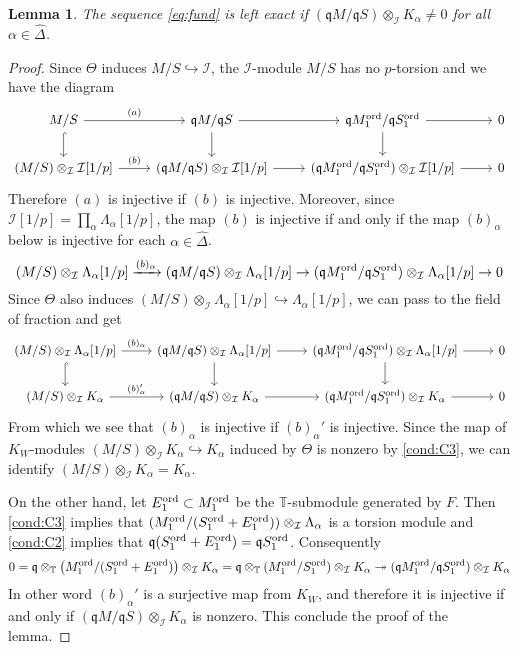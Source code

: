 \documentclass[leqno]{amsart}
\newtheorem{lem}[thm]{Lemma}
\theoremstyle{definition}
\theoremstyle{remark}
\newcommand{\fq}{\mathfrak{q}}
\newcommand{\TT}{\mathbb{T}} %
\newcommand{\I}{\mathcal{I}} %
\newcommand{\ord}{\textnormal{ord}} %
\begin{document}
\begin{lem}\label{lem:inj_crit}
The sequence \eqref{eq:fund}
is left exact if 
$(\fq M/\fq S)\otimes_{\I}K_\alpha\neq 0$
for all $\alpha\in\hat{\Delta}$.
\end{lem}
\begin{proof}
Since $\Theta$ induces $M/S\hookrightarrow\I$,
the $\I$-module $M/S$ has no $p$-torsion and we have the diagram
\[
\begin{tikzcd}
M/S
\arrow[r,"(a)"]\arrow[d,hookrightarrow] &
\fq M/\fq S
\arrow[r]\arrow[d] &
\fq M_1^{\ord}/\fq S_1^{\ord}
\arrow[r]\arrow[d] & 0\\
(M/S)\otimes_{\I}\I[1/p]
\arrow[r,"(b)"] &
(\fq M/\fq S)\otimes_{\I}\I[1/p]
\arrow[r] &
(\fq M_1^{\ord}/\fq S_1^{\ord})\otimes_{\I}\I[1/p]
\arrow[r] & 0
\end{tikzcd}
\]
Therefore $(a)$ is injective if
$(b)$ is injective.
Moreover, since $\I[1/p]=\prod_\alpha \Lambda_\alpha[1/p]$,
the map $(b)$ is injective if and only if the map $(b)_\alpha$ below
is injective for each $\alpha\in\hat{\Delta}$.
\[
(M/S)\otimes_{\I}\Lambda_\alpha[1/p]
\xrightarrow{(b)_\alpha}
(\fq M/\fq S)\otimes_{\I}\Lambda_\alpha[1/p] \to
(\fq M_1^{\ord}/\fq S_1^{\ord})\otimes_{\I}\Lambda_\alpha[1/p]\to 0
\]
Since $\Theta$ also induces
$(M/S)\otimes_{\I}\Lambda_\alpha[1/p]
\hookrightarrow\Lambda_\alpha[1/p]$,
we can pass to the field of fraction and get
\[
\begin{tikzcd}
(M/S)\otimes_{\I}\Lambda_\alpha[1/p]
\arrow[r,"(b)_\alpha"]\arrow[d,hookrightarrow] &
(\fq M/\fq S)\otimes_{\I}\Lambda_\alpha[1/p]
\arrow[r]\arrow[d] &
(\fq M_1^{\ord}/\fq S_1^{\ord})\otimes_{\I}\Lambda_\alpha[1/p]
\arrow[r]\arrow[d] & 0\\
(M/S)\otimes_{\I}K_\alpha
\arrow[r,"(b)_\alpha'"] &
(\fq M/\fq S)\otimes_{\I}K_\alpha
\arrow[r] &
(\fq M_1^{\ord}/\fq S_1^{\ord})\otimes_{\I}K_\alpha
\arrow[r] & 0
\end{tikzcd}
\]
From which we see that $(b)_\alpha$ 
is injective if $(b)_\alpha'$ is injective.
Since the map of $K_W$-modules
$(M/S)\otimes_{\I}K_\alpha\hookrightarrow K_\alpha$
induced by $\Theta$ is nonzero by \ref{cond:C3},
we can identify
$(M/S)\otimes_{\I}K_\alpha=K_\alpha$.

On the other hand,
let $E_1^{\ord}\subset M_1^{\ord}$
be the $\TT$-submodule generated by $F$.
Then \ref{cond:C3} implies that
$(M_1^{\ord}/(S_1^{\ord}+E_1^{\ord}))\otimes_{\I}\Lambda_\alpha$
is a torsion module and \ref{cond:C2} implies that
$\fq(S_1^{\ord}+E_1^{\ord})=\fq S_1^{\ord}$.
Consequently
\[
    0=\fq\otimes_{\TT}\left(M_1^{\ord}/(S_1^{\ord}+E_1^{\ord})\right)
    \otimes_{\I}K_\alpha
    =\fq\otimes_{\TT}(M_1^{\ord}/S_1^{\ord})
    \otimes_{\I}K_\alpha
    \twoheadrightarrow
    (\fq M_1^{\ord}/\fq S_1^{\ord})\otimes_{\I}K_\alpha
\]
In other word $(b)_\alpha'$ is a surjective map from $K_W$,
and therefore it is injective if and only if
$(\fq M/\fq S)\otimes_{\I}K_\alpha$ is nonzero.
This conclude the proof of the lemma.
\end{proof}
\end{document}
